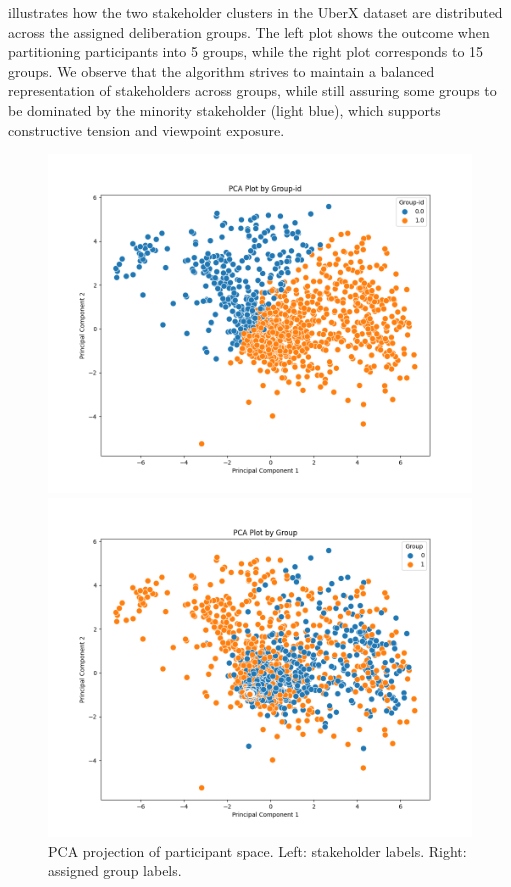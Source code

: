  illustrates how the two stakeholder clusters in the UberX dataset
are distributed across the assigned deliberation groups.
The left plot shows the outcome when partitioning participants into 5 groups,
while the right plot corresponds to 15 groups.
We observe that the algorithm strives to maintain a balanced representation of stakeholders across groups,
while still assuring some groups to be dominated by the minority stakeholder (light blue),
which supports constructive tension and viewpoint exposure.

\begin{figure}[htbp]
    \centering
    \begin{minipage}[t]{0.49\textwidth}
        \centering
        \includegraphics[width=\linewidth]{assets/pca_group-id.png}
    \end{minipage}
    \hfill
    \begin{minipage}[t]{0.49\textwidth}
        \centering
        \includegraphics[width=\linewidth]{assets/pca_grouping_2.png}
    \end{minipage}
    \caption{PCA projection of participant space. Left: stakeholder labels. Right: assigned group labels.}
    \label{fig:pca_grouping_comparison}
\end{figure}

